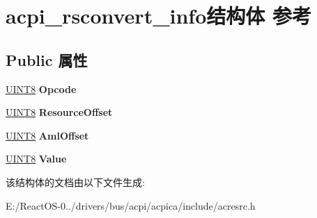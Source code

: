 \hypertarget{structacpi__rsconvert__info}{}\section{acpi\+\_\+rsconvert\+\_\+info结构体 参考}
\label{structacpi__rsconvert__info}
\subsection*{Public 属性}
\begin{DoxyCompactItemize}
\item 
\mbox{\label{structacpi__rsconvert__info_a7031e4b8fba8fb623fe060cdf371f06b}} 
\hyperlink{_processor_bind_8h_ab27e9918b538ce9d8ca692479b375b6a}{U\+I\+N\+T8} {\bfseries Opcode}
\item 
\mbox{\label{structacpi__rsconvert__info_ab7e784a53fd31abdf45d9e2f63efc162}} 
\hyperlink{_processor_bind_8h_ab27e9918b538ce9d8ca692479b375b6a}{U\+I\+N\+T8} {\bfseries Resource\+Offset}
\item 
\mbox{\label{structacpi__rsconvert__info_ae4372631e887d8df8ecee31718491508}} 
\hyperlink{_processor_bind_8h_ab27e9918b538ce9d8ca692479b375b6a}{U\+I\+N\+T8} {\bfseries Aml\+Offset}
\item 
\mbox{\label{structacpi__rsconvert__info_a063d30b3a98882762ddeb94a94462ae7}} 
\hyperlink{_processor_bind_8h_ab27e9918b538ce9d8ca692479b375b6a}{U\+I\+N\+T8} {\bfseries Value}
\end{DoxyCompactItemize}


该结构体的文档由以下文件生成\+:\begin{DoxyCompactItemize}
\item 
E\+:/\+React\+O\+S-\/0../drivers/bus/acpi/acpica/include/acresrc.\+h\end{DoxyCompactItemize}
